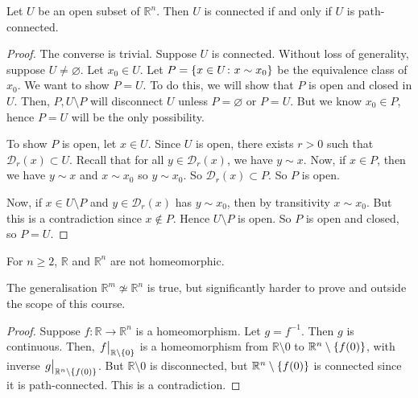 \begin{theorem}
	Let \( U \) be an open subset of \( \mathbb R^n \).
	Then \( U \) is connected if and only if \( U \) is path-connected.
\end{theorem}
\begin{proof}
	The converse is trivial.
	Suppose \( U \) is connected.
	Without loss of generality, suppose \( U \neq \varnothing \).
	Let \( x_0 \in U \).
	Let \( P = \qty{x \in U \colon x \sim x_0} \) be the equivalence class of \( x_0 \).
	We want to show \( P = U \).
	To do this, we will show that \( P \) is open and closed in \( U \).
	Then, \( P, U \setminus P \) will disconnect \( U \) unless \( P = \varnothing \) or \( P = U \).
	But we know \( x_0 \in P \), hence \( P = U \) will be the only possibility.

	To show \( P \) is open, let \( x \in U \).
	Since \( U \) is open, there exists \( r > 0 \) such that \( \mathcal D_r(x) \subset U \).
	Recall that for all \( y \in \mathcal D_r(x) \), we have \( y \sim x \).
	Now, if \( x \in P \), then we have \( y \sim x \) and \( x \sim x_0 \) so \( y \sim x_0 \).
	So \( \mathcal D_r(x) \subset P \).
	So \( P \) is open.

	Now, if \( x \in U \setminus P \) and \( y \in \mathcal D_r(x) \) has \( y \sim x_0 \), then by transitivity \( x \sim x_0 \).
	But this is a contradiction since \( x \not\in P \).
	Hence \( U \setminus P \) is open.
	So \( P \) is open and closed, so \( P = U \).
\end{proof}
\begin{theorem}
	For \( n \geq 2 \), \( \mathbb R \) and \( \mathbb R^n \) are not homeomorphic.
\end{theorem}
The generalisation \( \mathbb R^m \not\simeq \mathbb R^n \) is true, but significantly harder to prove and outside the scope of this course.
\begin{proof}
	Suppose \( f \colon \mathbb R \to \mathbb R^n \) is a homeomorphism.
	Let \( g = f^{-1} \).
	Then \( g \) is continuous.
	Then, \( \eval{f}_{\mathbb R \setminus \qty{0}} \) is a homeomorphism from \( \mathbb R \setminus \qty{0} \) to \( \mathbb R^n \setminus \qty{f(0)} \), with inverse \( \eval{g}_{\mathbb R^n \setminus \qty{f(0)}} \).
	But \( \mathbb R \setminus \qty{0} \) is disconnected, but \( \mathbb R^n \setminus \qty{f(0)} \) is connected since it is path-connected.
	This is a contradiction.
\end{proof}

